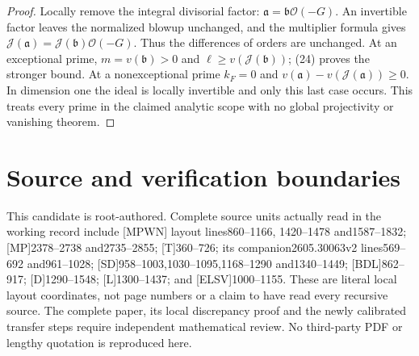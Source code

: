 \documentclass[11pt]{article}
\newcommand{\J}{\mathcal J}
\begin{document}
\begin{proof}
Locally remove the integral divisorial factor:
$\mathfrak a=\mathfrak b\mathcal O(-G)$.
An invertible factor leaves the normalized blowup unchanged, and
the multiplier formula gives
$\J(\mathfrak a)=\J(\mathfrak b)\mathcal O(-G)$.
Thus the differences of orders are unchanged. At an exceptional
prime, $m=v(\mathfrak b)>0$ and
$\ell\geq v(\J(\mathfrak b))$; (24) proves the stronger bound.
At a nonexceptional prime $k_F=0$ and
$v(\mathfrak a)-v(\J(\mathfrak a))\geq0$.
In dimension one the ideal is locally invertible and only this
last case occurs. This treats every prime in the claimed analytic
scope with no global projectivity or vanishing theorem.
\end{proof}

\section{Source and verification boundaries}
This candidate is root-authored. Complete source units actually read
in the working record include [MPWN] layout lines860--1166,
1420--1478 and1587--1832; [MP]2378--2738 and2735--2855;
[T]360--726; its companion2605.30063v2 lines569--692 and961--1028;
[SD]958--1003,1030--1095,1168--1290 and1340--1449;
[BDL]862--917; [D]1290--1548; [L]1300--1437;
and [ELSV]1000--1155. These are literal local layout coordinates,
not page numbers or a claim to have read every recursive source.
The complete paper, its local discrepancy proof and the newly
calibrated transfer steps require independent mathematical review.
No third-party PDF or lengthy quotation is reproduced here.
\end{document}
